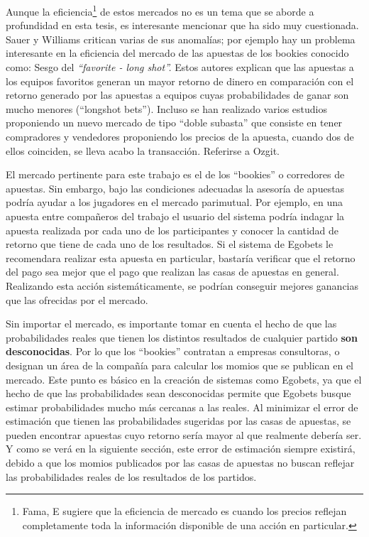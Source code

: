  Aunque la eficiencia\footnote{Fama, E \cite{fama1998market} sugiere que la eficiencia de mercado es cuando los precios reflejan completamente toda la información disponible de una acción en particular.} de estos mercados no es un tema que se aborde a profundidad en esta tesis, es interesante mencionar que ha sido  muy cuestionada. Sauer \cite{sauer1998economics} y Williams \cite{williams1999information} critican varias de sus anomalías; por ejemplo hay un problema interesante en la eficiencia del mercado de las apuestas de los bookies conocido como: Sesgo del \emph{``favorite - long shot''.} Estos autores explican que las apuestas a los equipos favoritos generan un mayor retorno de dinero en comparación con el retorno generado por las apuestas a equipos cuyas probabilidades de ganar son mucho menores (``longshot bets''). Incluso se han realizado varios estudios proponiendo un nuevo mercado de tipo ``doble subasta'' que consiste en tener compradores y vendedores proponiendo los precios de la apuesta, cuando dos de ellos coinciden, se lleva acabo la transacción. Referirse a Ozgit\cite{ozgit2005posted}.

 El mercado pertinente para este trabajo es el de los ``bookies'' o corredores de apuestas. Sin embargo, bajo las condiciones adecuadas la asesoría de apuestas podría ayudar a los jugadores en el mercado parimutual. Por ejemplo, en una apuesta entre compañeros del trabajo el usuario del sistema podría indagar la apuesta realizada por cada uno de los participantes y conocer la cantidad de retorno que tiene de cada uno de los resultados. Si el sistema de Egobets le recomendara realizar esta apuesta en particular, bastaría verificar que el retorno del pago sea mejor que el pago que realizan las casas de apuestas en general. Realizando esta acción sistemáticamente, se podrían conseguir mejores ganancias que las ofrecidas por el mercado.

 Sin importar el mercado, es importante tomar en cuenta el hecho de que las probabilidades reales que tienen los distintos resultados de cualquier partido \textbf{son desconocidas}. Por lo que los ``bookies'' contratan a empresas consultoras, o designan un área de la compañía para calcular los momios que se publican en el mercado. Este punto es básico en la creación de sistemas como Egobets, ya que el hecho de que las probabilidades sean desconocidas permite que Egobets busque estimar probabilidades mucho más cercanas a las reales. Al minimizar el error de estimación que tienen las probabilidades sugeridas por las casas de apuestas, se pueden encontrar apuestas cuyo retorno sería mayor al que realmente debería ser. Y como se verá en la siguiente sección, este error de estimación siempre existirá, debido a que los momios publicados por las casas de apuestas no buscan reflejar las probabilidades reales de los resultados de los partidos.

